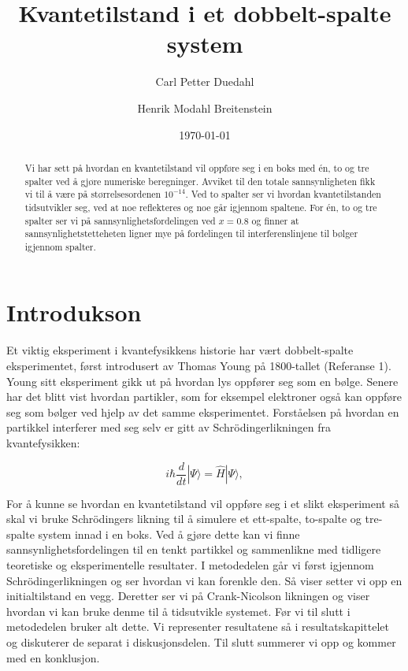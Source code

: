 \documentclass[reprint,english,notitlepage]{revtex4-2}  %
\begin{document}
\title{Kvantetilstand i et dobbelt-spalte system}   %
\author{Carl Petter Duedahl}               %
\author{Henrik Modahl Breitenstein}        %
\date{\today}                             %
\noaffiliation                            %
\begin{abstract}                          %
Vi har sett på hvordan en kvantetilstand vil oppføre seg i en boks med én, to og tre spalter ved å gjøre numeriske beregninger. Avviket til den totale sannsynligheten fikk vi til å være på størrelsesordenen $10^{-14}$. Ved to spalter ser vi hvordan kvantetilstanden tidsutvikler seg, ved at noe reflekteres og noe går igjennom spaltene. For én, to og tre spalter ser vi på sannsynlighetsfordelingen ved $x=0.8$ og finner at sannsynlighetstetteheten ligner mye på fordelingen til interferenslinjene til bølger igjennom spalter.              %
\end{abstract}                            %
\maketitle                                %


\section{Introdukson}
Et viktig eksperiment i kvantefysikkens historie har vært dobbelt-spalte eksperimentet, først introdusert av Thomas Young på 1800-tallet (Referanse 1). Young sitt eksperiment gikk ut på hvordan lys oppfører seg som en bølge. Senere har det blitt vist hvordan partikler, som for eksempel elektroner også kan oppføre seg som bølger ved hjelp av det samme eksperimentet. Forståelsen på hvordan en partikkel interferer med seg selv er gitt av Schrödingerlikningen fra kvantefysikken:

\begin{equation}
	i \hbar \frac{d}{dt} |\Psi\rangle = \hat{H} |\Psi\rangle,
\end{equation}

For å kunne se hvordan en kvantetilstand vil oppføre seg i et slikt eksperiment så skal vi bruke Schrödingers likning til å simulere et ett-spalte, to-spalte og tre-spalte system innad i en boks. Ved å gjøre dette kan vi finne sannsynlighetsfordelingen til en tenkt partikkel og sammenlikne med tidligere teoretiske og eksperimentelle resultater. I metodedelen går vi først igjennom Schrödingerlikningen og ser hvordan vi kan forenkle den. Så viser setter vi opp en initialtilstand en vegg. Deretter ser vi på Crank-Nicolson likningen og viser hvordan vi kan bruke denme til å tidsutvikle systemet. Før vi til slutt i metodedelen bruker alt dette. Vi representer resultatene så i resultatskapittelet og diskuterer de separat i diskusjonsdelen. Til slutt summerer vi opp og kommer med en konklusjon.
\end{document}
